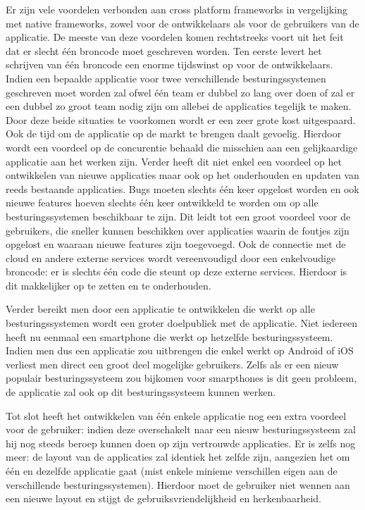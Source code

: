 Er zijn vele voordelen verbonden aan cross platform frameworks in vergelijking met native frameworks, zowel voor de ontwikkelaars als voor de gebruikers van de applicatie. De meeste van deze voordelen komen rechtstreeks voort uit het feit dat er slecht één broncode moet geschreven worden. Ten eerste levert het schrijven van één broncode een enorme tijdswinst op voor de ontwikkelaars. Indien een bepaalde applicatie voor twee verschillende besturingssystemen geschreven moet worden zal ofwel één team er dubbel zo lang over doen of zal er een dubbel zo groot team nodig zijn om allebei de applicaties tegelijk te maken. Door deze beide situaties te voorkomen wordt er een zeer grote kost uitgespaard. Ook de tijd om de applicatie op de markt te brengen daalt gevoelig. Hierdoor wordt een voordeel op de concurentie behaald die misschien aan een gelijkaardige applicatie aan het werken zijn. Verder heeft dit niet enkel een voordeel op het ontwikkelen van nieuwe applicaties maar ook op het onderhouden en updaten van reeds bestaande applicaties. Bugs moeten slechts één keer opgelost worden en ook nieuwe features hoeven slechts één keer ontwikkeld te worden om op alle besturingssystemen beschikbaar te zijn. Dit leidt tot een groot voordeel voor de gebruikers, die sneller kunnen beschikken over applicaties waarin de foutjes zijn opgelost en waaraan nieuwe features zijn toegevoegd. Ook de connectie met de cloud en andere externe services wordt vereenvoudigd door een enkelvoudige broncode: er is slechts één code die steunt op deze externe services. Hierdoor is dit makkelijker op te zetten en te onderhouden.

Verder bereikt men door een applicatie te ontwikkelen die werkt op alle besturingssystemen wordt een groter doelpubliek met de applicatie. Niet iedereen heeft nu eenmaal een smartphone die werkt op hetzelfde besturingssysteem. Indien men dus een applicatie zou uitbrengen die enkel werkt op Android of iOS verliest men direct een groot deel mogelijke gebruikers. Zelfs als er een nieuw populair besturingssysteem zou bijkomen voor smarpthones is dit geen probleem, de applicatie zal ook op dit besturingssysteem kunnen werken.

Tot slot heeft het ontwikkelen van één enkele applicatie nog een extra voordeel voor de gebruiker: indien deze overschakelt naar een nieuw besturingssysteem zal hij nog steeds beroep kunnen doen op zijn vertrouwde applicaties. Er is zelfs nog meer: de layout van de applicaties zal identiek het zelfde zijn, aangezien het om één en dezelfde applicatie gaat (mist enkele minieme verschillen eigen aan de verschillende besturingssystemen). Hierdoor moet de gebruiker niet wennen aan een nieuwe layout en stijgt de gebruiksvriendelijkheid en herkenbaarheid.

